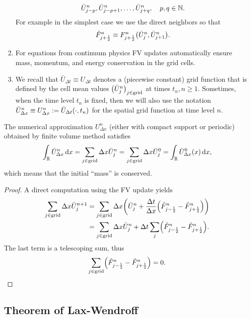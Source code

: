 \begin{remark}
\begin{enumerate}
		\[
			\bar{U}_{j - p}^n, \bar{U}_{j - p + 1}^n, \ldots, \bar{U}_{j + q}^n, \quad p, q \in \N.
		\]
		For example in the simplest case we use the direct neighbors so that
		\[
			\tilde{F}_{j + \frac{1}{2}}^n \equiv F_{j + \frac{1}{2}}^n\parentheses*{\bar{U}_j^n, \bar{U}_{j + 1}^n}.
		\]
		\item For equations from continuum physics FV updates automatically ensure mass, momentum, and energy conservation in the grid cells.
		\item We recall that \(\bar{U}_{\Delta t} \equiv U_{\Delta t}\) denotes a (piecewise constant) grid function that is defined by the cell mean values \(\parentheses*{\bar{U}_j^n}_{j \in \text{grid}}\) at times \(t_n, n \ge 1\).
		Sometimes, when the time level \(t_n\) is fixed, then we will also use the notation \(\bar{U}_{\Delta x}^n \equiv U_{\Delta x}^n := \bar{U}_{\Delta t}\parentheses*{\cdot, t_n}\) for the spatial grid function at time level \(n\).
	\end{enumerate}

	\begin{theorem}
		The numerical approximation \(U_{\Delta x}^n\) (either with compact support or periodic) obtained by finite volume method satisfies
		\[
			\int_\R \bar{U}_{\Delta x}^n\d x = \sum_{j \in \text{grid}}\Delta x\bar{U}_j^n = \sum_{j \in \text{grid}}\Delta x\bar{U}_j^0 = \int_\R \bar{U}_{\Delta x}^0 \parentheses*{x}\d x,
		\]
		which means that the initial ``mass'' is conserved.
	\end{theorem}

	\begin{proof}
		A direct computation using the FV update yields
		\begin{align*}
			\sum_{j \in \text{grid}}\Delta x\bar{U}_j^{n + 1} &= \sum_{j \in \text{grid}}\Delta x\parentheses*{\bar{U}_j^n + \frac{\Delta t}{\Delta x}\parentheses*{\tilde{F}_{j - \frac{1}{2}}^n - \tilde{F}_{j + \frac{1}{2}}^n}}\\
			&= \sum_{j \in \text{grid}}\Delta x\bar{U}_j^n + \Delta t\sum_j \parentheses*{\tilde{F}_{j - \frac{1}{2}}^n - \tilde{F}_{j + \frac{1}{2}}^n}.
		\end{align*}
		The last term is a telescoping sum, thus
		\[
			\sum_{j \in \text{grid}}\parentheses*{\tilde{F}_{j - \frac{1}{2}}^n - \tilde{F}_{j + \frac{1}{2}}^n} = 0.
		\]
	\end{proof}
\end{remark}


\subsection{Theorem of Lax-Wendroff}


